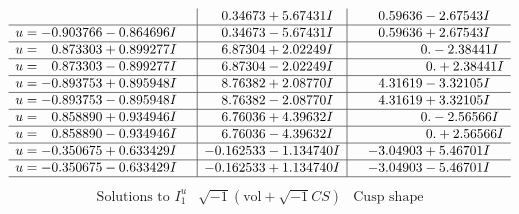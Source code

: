 \documentclass[1p]{elsarticle_modified}
\theoremstyle{definition}
\newcommand{\I}{\sqrt{-1}}
\begin{document}
$$\begin{array}{c|c|c}
 & \phantom{-}0.34673 + 5.67431 I & \phantom{-}0.59636 - 2.67543 I \\ \hline\begin{aligned}
u &= -0.903766 - 0.864696 I\end{aligned}
 & \phantom{-}0.34673 - 5.67431 I & \phantom{-}0.59636 + 2.67543 I \\ \hline\begin{aligned}
u &= \phantom{-}0.873303 + 0.899277 I\end{aligned}
 & \phantom{-}6.87304 + 2.02249 I & \phantom{-0.000000 } 0. - 2.38441 I \\ \hline\begin{aligned}
u &= \phantom{-}0.873303 - 0.899277 I\end{aligned}
 & \phantom{-}6.87304 - 2.02249 I & \phantom{-0.000000 -}0. + 2.38441 I \\ \hline\begin{aligned}
u &= -0.893753 + 0.895948 I\end{aligned}
 & \phantom{-}8.76382 + 2.08770 I & \phantom{-}4.31619 - 3.32105 I \\ \hline\begin{aligned}
u &= -0.893753 - 0.895948 I\end{aligned}
 & \phantom{-}8.76382 - 2.08770 I & \phantom{-}4.31619 + 3.32105 I \\ \hline\begin{aligned}
u &= \phantom{-}0.858890 + 0.934946 I\end{aligned}
 & \phantom{-}6.76036 + 4.39632 I & \phantom{-0.000000 } 0. - 2.56566 I \\ \hline\begin{aligned}
u &= \phantom{-}0.858890 - 0.934946 I\end{aligned}
 & \phantom{-}6.76036 - 4.39632 I & \phantom{-0.000000 -}0. + 2.56566 I \\ \hline\begin{aligned}
u &= -0.350675 + 0.633429 I\end{aligned}
 & -0.162533 - 1.134740 I & -3.04903 + 5.46701 I \\ \hline\begin{aligned}
u &= -0.350675 - 0.633429 I\end{aligned}
 & -0.162533 + 1.134740 I & -3.04903 - 5.46701 I\\
 \hline 
 \end{array}$$\newpage$$\begin{array}{c|c|c}  
\text{Solutions to }I^u_{1}& \I (\text{vol} + \sqrt{-1}CS) & \text{Cusp shape}\\

\end{array}$$
\end{document}
